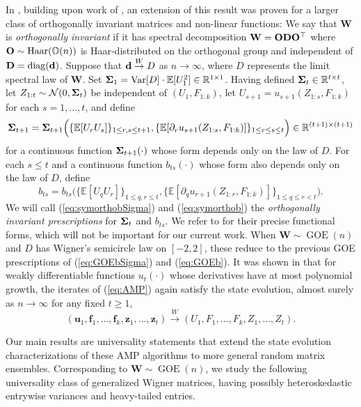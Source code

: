 \documentclass[10pt,reqno]{amsart}
\def\u{\mathbf{u}}
\def\z{\mathbf{z}}
\def\f{\mathbf{f}}
\def\W{\mathbf{W}}
\def\D{\mathbf{D}}
\def\E{\mathbb{E}}
\def\R{\mathbb{R}}
\def\Var{\operatorname{Var}}
\def\diag{\operatorname{diag}}
\def\Normal{\mathcal{N}}
\def\GOE{\operatorname{GOE}}
\def\toW{\overset{W}{\to}}
\def\Haar{\operatorname{Haar}}
\def\OO{\mathbb{O}}
\begin{document}
In \cite{fan2022approximate}, building upon work of \cite{opper2016theory},
an extension of this result was proven for a
larger class of orthogonally invariant matrices and non-linear functions:
We say that $\W$ is \emph{orthogonally invariant} if
it has spectral decomposition $\W=\bO\D\bO^\top$ where
$\bO \sim \Haar(\OO(n))$ is Haar-distributed
on the orthogonal group and independent of $\D=\diag(\bd)$.
Suppose that $\bd \toW D$ as $n \to \infty$, where $D$ represents the limit
spectral law of $\W$.
Set $\bSigma_1=\Var[D] \cdot \E[U_1^2] \in \R^{1 \times 1}$. Having defined
$\bSigma_t \in \R^{t \times t}$, let $Z_{1:t} \sim \Normal(0,\bSigma_t)$ be
independent of $(U_1,F_{1:k})$, let
$U_{s+1}=u_{s+1}(Z_{1:s},F_{1:k})$ for each $s=1,\ldots,t$, and define
\begin{equation}\label{eq:symorthobSigma}
\bSigma_{t+1}=\bSigma_{t+1}\Big(\{\E[U_rU_s]\}_{1 \leq r,s \leq t+1},
\{\E[\partial_r u_{s+1}(Z_{1:s},F_{1:k})]\}_{1 \leq r \leq s \leq t}\Big)
\in \R^{(t+1) \times (t+1)}
\end{equation}
for a continuous function $\bm{\Sigma}_{t+1}(\cdot)$ whose form depends only on the law of $D$.
For each $s \leq t$ and a continuous function $b_{ts}(\cdot)$ whose 
form also depends only on the law of $D$, define
\begin{equation}\label{eq:symorthob}
b_{ts}=b_{ts}\Big(\{\E[U_qU_r]\}_{1 \leq q,r \leq t},
\{\E[\partial_q u_{r+1}(Z_{1:r},F_{1:k})]\}_{1 \leq q \leq r<t}\Big).
\end{equation}
We will call (\ref{eq:symorthobSigma}) and (\ref{eq:symorthob}) the
\emph{orthogonally invariant prescriptions} for $\bm{\Sigma}_t$ and $b_{ts}$.
We refer to \cite[Section 4]{fan2022approximate} for
their precise functional forms, which will not be important for our current
work. When $\W \sim \GOE(n)$ and $D$ has Wigner's semicircle
law on $[-2,2]$, these reduce to the previous GOE prescriptions
of (\ref{eq:GOEbSigma}) and (\ref{eq:GOEb}). 
It was shown in \cite{fan2022approximate} that
for weakly differentiable functions $u_t(\cdot)$ whose derivatives have
at most polynomial growth, the iterates of (\ref{eq:AMP}) again satisfy the
state evolution, almost surely as $n \to \infty$ for any fixed $t \geq 1$,
\[(\u_1,\f_1,\ldots,\f_k,\z_1,\ldots,\z_t) \toW
(U_1,F_1,\ldots,F_k,Z_1,\ldots,Z_t).\]

Our main results are universality statements that extend the state evolution
characterizations of these AMP algorithms to more general
random matrix ensembles. Corresponding to $\W \sim \GOE(n)$, we
study the following universality class of generalized Wigner matrices, having
possibly heteroskedastic entrywise variances and heavy-tailed entries.
\end{document}
